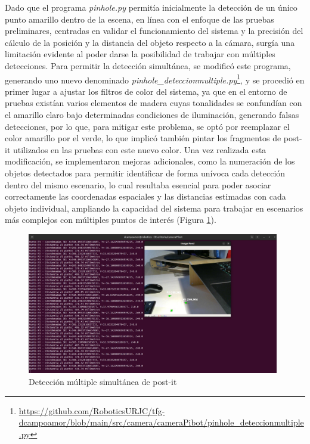 Dado que el programa \textit{pinhole.py} permitía inicialmente la detección de un único punto amarillo dentro de la escena, en línea con el enfoque de las pruebas preliminares, centradas en validar el funcionamiento del sistema y la precisión del cálculo de la posición y la distancia del objeto respecto a la cámara, surgía una limitación evidente al poder darse la posibilidad de trabajar con múltiples detecciones. Para permitir la detección simultánea, se modificó este programa, generando uno nuevo denominado \textit{pinhole\_deteccionmultiple.py}\footnote{\url{https://github.com/RoboticsURJC/tfg-dcampoamor/blob/main/src/camera/cameraPibot/pinhole_deteccionmultiple.py}}, y se procedió en primer lugar a ajustar los filtros de color del sistema, ya que en el entorno de pruebas existían varios elementos de madera cuyas tonalidades se confundían con el amarillo claro bajo determinadas condiciones de iluminación, generando falsas detecciones, por lo que, para mitigar este problema, se optó por reemplazar el color amarillo por el verde, lo que implicó también pintar los fragmentos de post-it utilizados en las pruebas con este nuevo color. Una vez realizada esta modificación, se implementaron mejoras adicionales, como la numeración de los objetos detectados para permitir identificar de forma unívoca cada detección dentro del mismo escenario, lo cual resultaba esencial para poder asociar correctamente las coordenadas espaciales y las distancias estimadas con cada objeto individual, ampliando la capacidad del sistema para trabajar en escenarios más complejos con múltiples puntos de interés (Figura \ref{fig:deteccion_multiple_ptos}).

   \begin{figure}[H]
   \centering
   \begin{center}
     \includegraphics[width=110mm]{figs/Deteccionmultiple ejemplo.png}
   \end{center}
   \caption{Detección múltiple simultánea de post-it}
   \label{fig:deteccion_multiple_ptos}
  \end{figure}
  
